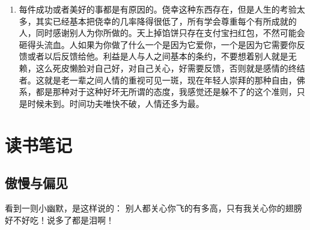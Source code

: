 \documentclass[color=green,mathpazo,titlestyle=hang]{elegantbook}
\begin{document}
\begin{enumerate}
	\item 
	{\color{main}每件成功或者美好的事都是有原因的。}侥幸这种东西存在，但是人生的考验太多，其实已经基本把侥幸的几率降得很低了，所有学会尊重每个有所成就的人，同时感谢别人为你所做的。天上掉馅饼只存在支付宝扫红包，不然可能会砸得头流血。人如果为你做了什么一个是因为它爱你，一个是因为它需要你反馈或者以后反馈给他。利益是人与人之间基本的条约，不要想着别人就是无赖，这么死皮懒脸对自己好，对自己关心，好需要反馈，否则就是感情的终结者。这就是老一辈之间人情的重视可见一斑，现在年轻人崇拜的那种自由，佛系，都是那种对于这种好坏无所谓的态度，我感觉还是躲不了的这个准则，只是时候未到。时间功夫唯快不破，人情还多为最。
\end{enumerate}


\chapter{读书笔记}

\section{傲慢与偏见}


\begin{conclusion}
看到一则小幽默，是这样说的：{\color{main} 别人都关心你飞的有多高，只有我关心你的翅膀好不好吃！}说多了都是泪啊！
\end{conclusion}
\end{document}
